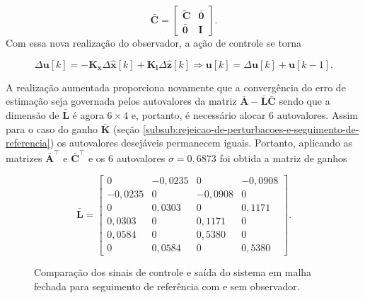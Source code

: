 \begin{equation}
    \label{eq:matriz-aumentada-c}
    \mathbf{\bar{C}}
    =
    \begin{bmatrix}
        \mathbf{\tilde{C}} & \mathbf{\bar{0}} \\
        \mathbf{\bar{0}}   & \mathbf{I}
    \end{bmatrix}\text{.}
\end{equation} Com essa nova realização do observador, a ação de controle se
torna

\begin{equation}
    \label{eq:acao-de-controle-com-obervador-e-integrador}
    \Delta \mathbf{u}[k] =
    - \mathbf{K_x} \Delta \mathbf{\hat{x}}[k]
    + \mathbf{K_i} \Delta \mathbf{\hat{z}}[k]
    \Rightarrow 
    \mathbf{u}[k] = \Delta \mathbf{u}[k] + \mathbf{u}[k-1]
    \text{.}
\end{equation}

A realização aumentada proporciona novamente que a convergência do erro de
estimação seja governada pelos autovalores da matriz $\mathbf{\bar{A}} -
\mathbf{\bar{L}}\mathbf{\bar{C}}$ sendo que a dimensão de $\mathbf{\bar{L}}$ é
agora $6 \times 4$ e, portanto, é necessário alocar 6 autovalores. Assim para o
caso do ganho $\mathbf{\bar{K}}$ (seção
\ref{subsub:rejeicao-de-perturbacoes-e-seguimento-de-referencia}) os autovalores
desejáveis permanecem iguais. Portanto, aplicando as matrizes
$\mathbf{\bar{A}}^\top$ e $\mathbf{\bar{C}}^\top$ e os 6 autovalores $\sigma =
0,6873$ foi obtida a matriz de ganhos

\begin{equation}
    \label{eq:matriz-l-aumentada}
    \mathbf{\bar{L}}
    =
    \begin{bmatrix}
        0       & -0,0235 & 0       & -0,0908   \\
        -0,0235 & 0       & -0,0908 & 0         \\
        0       & 0,0303  & 0       & 0,1171    \\
        0,0303  & 0       & 0,1171  & 0         \\
        0,0584  & 0       & 0,5380  & 0         \\
        0       & 0,0584  & 0       & 0,5380
    \end{bmatrix}
    \text{.}
\end{equation}

\begin{figure}[!ht]
    \caption{Comparação dos sinais de controle e saída do sistema em malha
    fechada para seguimento de referência com e sem observador.}
    \hspace{-30pt}
    \label{fig:resultado-do-regulador-com-observador-e-integrador}
    \begin{minipage}{\linewidth}
        
    \end{minipage}
\end{figure}

